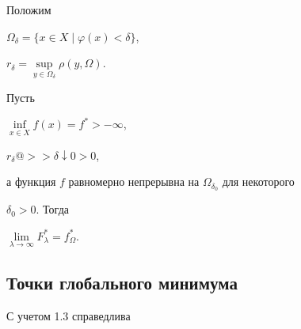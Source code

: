 Положим


$\Omega_{\delta} = \{x\in X \mid \varphi(x) < \delta\}$,


$r_{\delta} = \sup\limits_{y\in \Omega_{\delta}}\rho(y,\Omega)$.





\begin{lems}\label{L3.2}


Пусть




$\inf\limits_{x\in X}f(x) = f^{*} >-\infty$,




$r_{\delta} @>>{\delta \downarrow 0}> 0$,




а функция $f$ равномерно непрерывна на $\Omega_{\delta_0}$ для некоторого


$\delta_0 > 0$. Тогда




$\lim\limits_{\lambda \rightarrow \infty}F^{*}_{\lambda} =


f^{*}_{\Omega}$.




\end{lems}








\subsection{Точки глобального минимума}\label{ss1.4}





С учетом 1.3 справедлива





